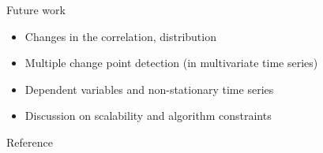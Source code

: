\documentclass{beamer}
\begin{document}
\begin{frame}{Future work}
    \begin{itemize}
        \item Changes in the correlation, distribution
        \bigskip

        \item Multiple change point detection (in multivariate time series)
        \bigskip

        \item Dependent variables and non-stationary time series
        \bigskip

        \item Discussion on scalability and algorithm constraints
    \end{itemize}
\end{frame}


\begin{frame}[allowframebreaks]{Reference}
    \nocite{*}
    \AtNextBibliography{\scriptsize}
    \printbibliography
\end{frame}
\end{document}
